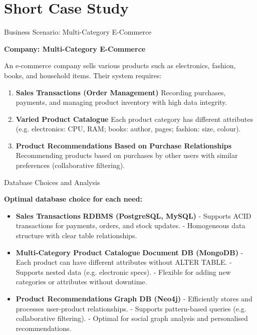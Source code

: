 \documentclass[aspectratio=169, table]{beamer}
\begin{document}
\section{Short Case Study}

\begin{frame}{\LARGE{Business Scenario: Multi-Category E-Commerce}}
	\vspace{20pt}
	
	\textbf{Company: Multi-Category E-Commerce}
	
	An e-commerce company sells various products such as electronics, fashion, books, and household items. Their system requires:
	
	\begin{enumerate}
		\item \textbf{Sales Transactions (Order Management)}  
		Recording purchases, payments, and managing product inventory with high data integrity.
		
		\item \textbf{Varied Product Catalogue}  
		Each product category has different attributes (e.g. electronics: CPU, RAM; books: author, pages; fashion: size, colour).
		
		\item \textbf{Product Recommendations Based on Purchase Relationships}  
		Recommending products based on purchases by other users with similar preferences (collaborative filtering).
	\end{enumerate}
	
\end{frame}

\begin{frame}{Database Choices and Analysis}
	\vspace{20pt}
	
	\textbf{Optimal database choice for each need:}
	
	\begin{itemize}
		\item \textbf{Sales Transactions}  
		\textbf{RDBMS (PostgreSQL, MySQL)}  
		- Supports ACID transactions for payments, orders, and stock updates.  
		- Homogeneous data structure with clear table relationships.
		
		\item \textbf{Multi-Category Product Catalogue}  
		\textbf{Document DB (MongoDB)}  
		- Each product can have different attributes without ALTER TABLE.  
		- Supports nested data (e.g. electronic specs).  
		- Flexible for adding new categories or attributes without downtime.
		
		\item \textbf{Product Recommendations}  
		\textbf{Graph DB (Neo4j)}  
		- Efficiently stores and processes user-product relationships.  
		- Supports pattern-based queries (e.g. collaborative filtering).  
		- Optimal for social graph analysis and personalised recommendations.
	\end{itemize}
	
\end{frame}
\end{document}
